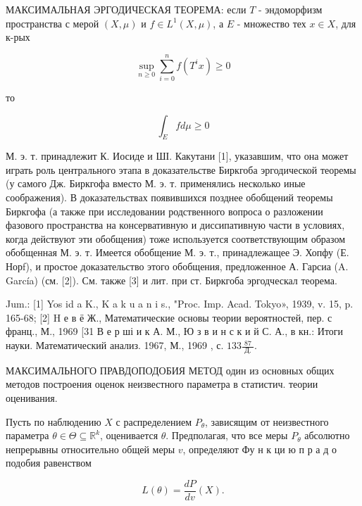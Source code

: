 \documentclass[10pt]{article}
\begin{document}
МАКСИМАЛЬНАЯ ЭРГОДИЧЕСКАЯ ТЕОРЕМА: если $T$ - эндоморфизм пространства с мерой $(X, \mu)$ и $f \in L^{1}(X, \mu)$, а $E$ - множество тех $x \in X$, для к-рых



\[

\sup _{n \geqslant 0} \sum_{i=0}^{n} f\left(T^{i} x\right) \geqslant 0

\]



то



\[

\int_{E} f d \mu \geqslant 0

\]



М. э. т. принадлежит К. Иосиде и ШІ. Какутани [1], указавшим, что она может играть роль центрального этапа в доказательстве Биркгоба эргодической теоремы (у самого Дж. Биркгофа вместо М. э. т. применялись несколько иные соображения). В доказательствах появившихся позднее обобщений теоремы Биркгофа (а также при исследовании родственного вопроса о разложении фазового пространства на консервативную и диссипативную части в условиях, когда действуют эти обобщения) тоже используется соответствующим образом обобщенная М. э. т. Имеется обобщение М. э. т., принадлежащее Э. Хопфу (Е. Норf), и простое доказательство этого обобщения, предложенное А. Гарсиа (A. García) (см. [2]). См. также [3] и лит. при ст. Биркгоба эргодческал теорема.



Jum.: [1] Yos id a K., K a k u a n i s., "Proc. Imp. Acad. Tokyo», 1939, v. 15, p. 165-68; [2] H е в ё Ж., Математические основы теории вероятностей, пер. с франц., М., 1969 [31 В е р ші и к А. М., Ю з в и н с к и й С. А., в кн.: Итоги науки. Математический анализ. 1967, М., 1969 , с. $133 \frac{87}{\text { Д. }}$.



МАКСИМАЛЬНОГО ПРАВДОПОДОБИЯ МЕТОД один из основных общих методов построения оценок неизвестного параметра в статистич. теории оценивания.



Пусть по наблюдению $X$ с распределением $P_{\theta}$, зависящим от неизвестного параметра $\theta \in \Theta \subseteq \mathbb{R}^{k}$, оценивается $\theta$. Предполагая, что все меры $P_{\theta}$ абсолютно непрерывны относительно общей меры $v$, определяют Фу н к ци ю п р а д о подобия равенством



\[

L(\theta)=\frac{d P}{d v}(X) .

\]
\end{document}
